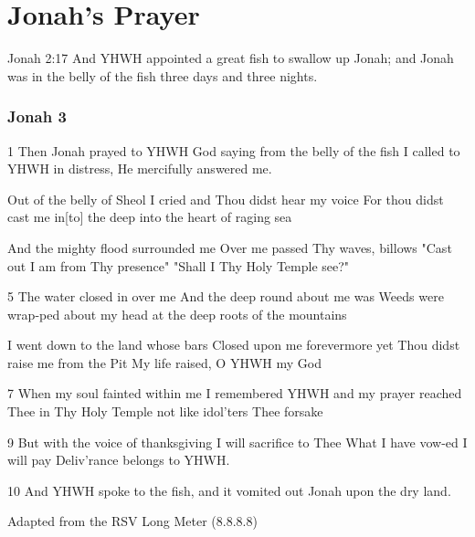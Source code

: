 \documentclass{article}
\begin{document}
\section*{Jonah's Prayer}

Jonah 2:17 And YHWH appointed a great fish to swallow up Jonah; and Jonah was in the belly of the fish three days and three nights.

\subsubsection*{Jonah 3}

1 Then Jonah prayed to YHWH God\newline
saying from the belly of the fish I called to YHWH in distress,\newline
He mercifully answered me.\newline

Out of the belly of Sheol\newline
I cried and Thou didst hear my voice For thou didst cast me in[to] the deep\newline
into the heart of raging sea\newline

And the mighty flood surrounded me\newline
Over me passed Thy waves, billows  "Cast out I am from Thy presence"\newline
"Shall I Thy Holy Temple see?"\newline

5 The water closed in over me\newline
And the deep round about me was\newline
Weeds were wrap-ped about my head at the deep roots of the mountains\newline

I went down to the land whose bars\newline
Closed upon me forevermore\newline
yet Thou didst raise me from the Pit\newline
My life raised, O YHWH my God\newline

7 When my soul fainted within me\newline
I remembered YHWH and my prayer\newline
reached Thee in Thy Holy Temple not like idol'ters Thee forsake\newline

9 But with the voice of thanksgiving\newline
I will sacrifice to Thee\newline
What I have vow-ed I will pay\newline
Deliv'rance belongs to YHWH.\newline

10 And YHWH spoke to the fish, and it vomited out Jonah upon the dry land.


Adapted from the RSV 
Long Meter (8.8.8.8)
  
\end{document}
